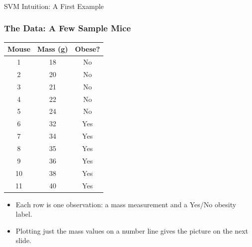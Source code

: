 \begin{frame}[fragile]\frametitle{}
\begin{center}
{\Large SVM Intuition: A First Example}
\end{center}
\end{frame}

\begin{frame}[fragile]\frametitle{The Data: A Few Sample Mice}
\begin{center}
\begin{tabular}{c|c|c}
\textbf{Mouse} & \textbf{Mass (g)} & \textbf{Obese?} \\ \hline
1 & 18 & No \\
2 & 20 & No \\
3 & 21 & No \\
4 & 22 & No \\
5 & 24 & No \\
6 & 32 & Yes \\
7 & 34 & Yes \\
8 & 35 & Yes \\
9 & 36 & Yes \\
10 & 38 & Yes \\
11 & 40 & Yes \\
\end{tabular}
\end{center}
\begin{itemize}
\item Each row is one observation: a mass measurement and a Yes/No obesity label.
\item Plotting just the mass values on a number line gives the picture on the next slide.
\end{itemize}
\end{frame}

